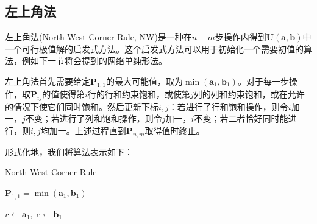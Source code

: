 \documentclass[cn,10pt,math=newtx,citestyle=gb7714-2015,bibstyle=gb7714-2015]{elegantbook}
\begin{document}
\subsection{左上角法}

左上角法(North-West Corner Rule, NW)是一种在$n+m$步操作内得到$\mathbf{U(a,b)}$中一个可行极值解的启发式方法。这个启发式方法可以用于初始化一个需要初值的算法，例如下一节将会提到的网络单纯形法。

左上角法首先需要给定$\mathbf{P}_{1,1}$的最大可能值，取为$\min(\mathbf{a}_1,\mathbf{b}_1)$。对于每一步操作，取$\mathbf{P}_{ij}$的值使得第$i$行的行和约束饱和，或使第$j$列的列和约束饱和，或在允许的情况下使它们同时饱和。然后更新下标$i,j$：若进行了行和饱和操作，则令$i$加一，$j$不变；若进行了列和饱和操作，则令$j$加一，$i$不变；若二者恰好同时能进行，则$i,j$均加一。上述过程直到$\mathbf{P}_{n,m}$取得值时终止。

形式化地，我们将算法表示如下：

\begin{algorithm}[]  %
	\caption{North-West Corner Rule}%
	\Set $\mathbf{P}_{1,1}=\min(\mathbf{a}_1,\mathbf{b}_1)$
	
	\Set $r\gets \mathbf{a}_1,\;c\gets \mathbf{b}_1$
	
\end{algorithm}
\end{document}
